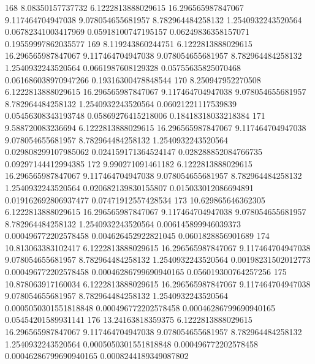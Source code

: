 {168 8.08350157737732 6.1222813888029615 16.296565987847067 9.117464704947038 9.078054655681957 8.782964484258132 1.2540932243520564 0.06782341003417969 0.05918100747195157 0.06249836358157071 0.19559997862035577
169 8.119243860244751 6.1222813888029615 16.296565987847067 9.117464704947038 9.078054655681957 8.782964484258132 1.2540932243520564 0.0661987608129328 0.05755635825070468 0.061686038970947266 0.19316300478848544
170 8.250947952270508 6.1222813888029615 16.296565987847067 9.117464704947038 9.078054655681957 8.782964484258132 1.2540932243520564 0.06021221117539839 0.05456308343193748 0.05869276415218006 0.18418318033218384
171 9.588720083236694 6.1222813888029615 16.296565987847067 9.117464704947038 9.078054655681957 8.782964484258132 1.2540932243520564 0.029808299107985062 0.024159171364524147 0.028288852084766735 0.09297144412994385
172 9.990271091461182 6.1222813888029615 16.296565987847067 9.117464704947038 9.078054655681957 8.782964484258132 1.2540932243520564 0.020682139830155807 0.015033012086694891 0.019162692806937477 0.07471912557428534
173 10.629865646362305 6.1222813888029615 16.296565987847067 9.117464704947038 9.078054655681957 8.782964484258132 1.2540932243520564 0.006145899946039373 0.000496772202578458 0.004626452922821045 0.0601828856901689
174 10.813063383102417 6.1222813888029615 16.296565987847067 9.117464704947038 9.078054655681957 8.782964484258132 1.2540932243520564 0.00198231502012773 0.000496772202578458 0.00046286799690940165 0.056019300764257256
175 10.878063917160034 6.1222813888029615 16.296565987847067 9.117464704947038 9.078054655681957 8.782964484258132 1.2540932243520564 0.0005050301551818848 0.000496772202578458 0.00046286799690940165 0.05454201589931141
176 13.24163818359375 6.1222813888029615 16.296565987847067 9.117464704947038 9.078054655681957 8.782964484258132 1.2540932243520564 0.0005050301551818848 0.000496772202578458 0.00046286799690940165 0.0008244189349087802
}\tableexpivwaitskltweet
